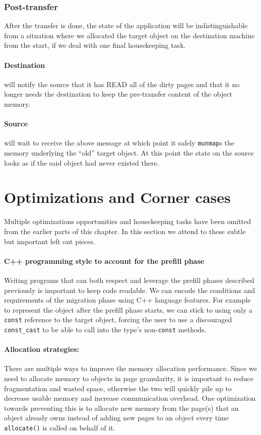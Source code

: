 \subsubsection{Post-transfer}
After the transfer is done, the state of the application will be
indistinguishable from a situation where we allocated the target object on
the destination machine from the start, if we deal with one final housekeeping
task.

\paragraph{Destination} will notify the source that it has READ all of the
dirty pages and that it no longer needs the destination to keep the
pre-transfer content of the object memory.

\paragraph{Source} will wait to receive the above message at which point it
safely \texttt{munmap}s the memory underlying the ``old'' target object. At
this point the state on the source looks as if the said object had never existed
there.


\section{Optimizations and Corner cases}
Multiple optimizations opportunities and housekeeping tasks have been omitted
from the earlier parts of this chapter. In this section we attend to these
subtle but important left out pieces.

\paragraph{C++ programming style to account for the prefill phase}
Writing programs that can both respect and leverage the prefill phases
described previously is important to keep code readable. We can encode the
conditions and requirements of the migration phase using C++ language features.
For example to represent the object after the prefill phase starts, we can
stick to using only a \texttt{const} reference to the target object,
forcing the user to use a discouraged \texttt{const\_cast} to be able to call
into the type's non-\texttt{const} methods.

\paragraph{Allocation strategies:} There are multiple ways to improve the memory
allocation performance. Since we need to allocate memory to objects in page
granularity, it is important to reduce fragmentation and wasted space,
otherwise the two will quickly pile up to decrease usable memory and increase
communication overhead. One optimization towards preventing this is to allocate
new memory from the page(s) that an object already owns instead of adding
new pages to an object every time \texttt{allocate()} is called on behalf of it.

